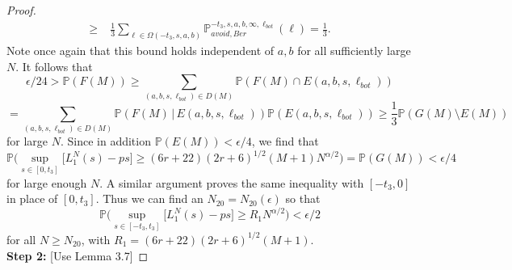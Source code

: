 \documentclass[12pt]{article}
\begin{document}
\begin{proof}
\begin{align*}
		\geq \; & \frac{1}{3}\sum_{\ell\in\Omega(-t_3,s,a,b)} \mathbb{P}^{-t_3,s,a,b,\infty,\ell_{bot}}_{avoid, Ber}(\ell) = \frac{1}{3}.
		\end{align*}
		Note once again that this bound holds independent of $a,b$ for all sufficiently large $N$. It follows that
		\[
		\epsilon/24 > \mathbb{P}(F(M)) \geq \sum_{(a,b,s,\ell_{bot})\in D(M)} \mathbb{P}(F(M)\cap E(a,b,s,\ell_{bot}))
		\]
		\[
		= \sum_{(a,b,s,\ell_{bot})\in D(M)} \mathbb{P}(F(M)\,|\, E(a,b,s,\ell_{bot}))\mathbb{P}(E(a,b,s,\ell_{bot})) \geq \frac{1}{3}\mathbb{P}(G(M)\setminus E(M))
		\]
		for large $N$. Since in addition $\mathbb{P}(E(M)) < \epsilon/4$, we find that
		\[
		\mathbb{P}\Big( \sup_{s \in [0,t_3] }\big[ L^N_1(s) - p s \big] \geq  (6r+22)(2r+6)^{1/2}(M+1)N^{\alpha/2} \Big) = \mathbb{P}(G(M)) < \epsilon/4
		\]
		for large enough $N$. A similar argument proves the same inequality with $[-t_3,0]$ in place of $[0,t_3]$. Thus we can find an $N_{20} = N_{20}(\epsilon)$ so that
		\[
		\mathbb{P}\Big( \sup_{s \in [-t_3,t_3] }\big[ L^N_1(s) - p s \big] \geq  R_1N^{\alpha/2} \Big) < \epsilon/2
		\]
		for all $N\geq N_{20}$, with $R_1 = (6r+22)(2r+6)^{1/2}(M+1)$.\\
		
		\noindent\textbf{Step 2:} [Use Lemma 3.7]
	
	\end{proof}
	
	
	
\end{document}
